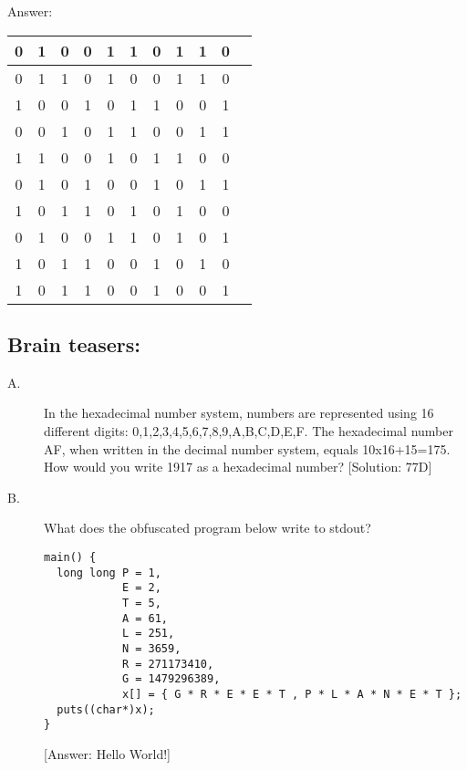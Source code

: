\documentclass{article}
\begin{document}
Answer:
\begin{table}[ht]
\centering
\begin{tabular}{|c|c|c|c|c|c|c|c|c|c|c|}
\hline 0 & 1 & 0 & 0 & 1 & 1 & 0 & 1 & 1 & 0 \\ 
\hline 0 & 1 & 1 & 0 & 1 & 0 & 0 & 1 & 1 & 0 \\ 
\hline 1 & 0 & 0 & 1 & 0 & 1 & 1 & 0 & 0 & 1 \\ 
\hline 0 & 0 & 1 & 0 & 1 & 1 & 0 & 0 & 1 & 1 \\ 
\hline 1 & 1 & 0 & 0 & 1 & 0 & 1 & 1 & 0 & 0 \\ 
\hline 0 & 1 & 0 & 1 & 0 & 0 & 1 & 0 & 1 & 1 \\ 
\hline 1 & 0 & 1 & 1 & 0 & 1 & 0 & 1 & 0 & 0 \\ 
\hline 0 & 1 & 0 & 0 & 1 & 1 & 0 & 1 & 0 & 1 \\ 
\hline 1 & 0 & 1 & 1 & 0 & 0 & 1 & 0 & 1 & 0 \\ 
\hline 1 & 0 & 1 & 1 & 0 & 0 & 1 & 0 & 0 & 1 \\
\hline
\end{tabular}
\end{table} 


\subsection*{Brain teasers:}
\begin{description}
\item[A.] In the hexadecimal number system, numbers are represented using 16 different digits: 0,1,2,3,4,5,6,7,8,9,A,B,C,D,E,F. The hexadecimal number AF, when written in the decimal number system, equals 10x16+15=175. How would you write 1917 as a hexadecimal number?
[Solution: 77D]

\item[B.] What does the obfuscated program below write to stdout?
\begin{lstlisting} 
main() {
  long long P = 1,
            E = 2,
            T = 5,
            A = 61,
            L = 251,
            N = 3659,
            R = 271173410,
            G = 1479296389,
            x[] = { G * R * E * E * T , P * L * A * N * E * T };
  puts((char*)x);
}
\end{lstlisting}
[Answer: Hello World!]
\end{description}
\end{document}

